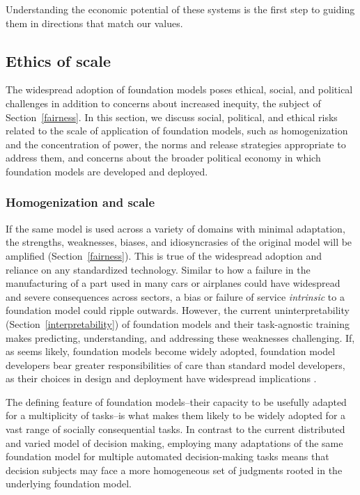 Understanding the economic potential of these systems is the first step to guiding them in directions that match our values.

\newsection
\subsection{Ethics of scale}
\label{sec:ethics}

The widespread adoption of foundation models poses ethical, social, and political challenges in addition to concerns about increased inequity, the subject of Section~\ref{fairness}. 
In this section, we discuss social, political, and ethical risks  related to the scale of application of foundation models, such as homogenization and the concentration of power, the norms and release strategies appropriate to address them, and concerns about the broader political economy in which foundation models are developed and deployed. 

\subsubsection{Homogenization and scale} 

If the same model is used across a variety of domains with minimal adaptation, the strengths, weaknesses, biases, and idiosyncrasies of the original model will be amplified (Section~\ref{fairness}). 
This is true of the widespread adoption and reliance on any standardized technology. Similar to how a failure in the manufacturing of a part used in many cars or airplanes could have widespread and severe consequences across sectors, a bias or failure of service \textit{intrinsic} to a foundation model could ripple outwards. However, the current uninterpretability (Section~\ref{interpretability}) of foundation models and their task-agnostic training makes predicting, understanding, and addressing these weaknesses challenging. If, as seems likely, foundation models become widely adopted, foundation model developers bear greater responsibilities of care than standard model developers, as their choices in design and deployment  have widespread implications \citep{Arendt1987}. 

The defining feature of foundation models--their capacity to be usefully adapted for a multiplicity of tasks--is what makes them likely to be widely adopted for a vast range of socially consequential tasks. In contrast to the current distributed and varied model of decision making, employing many adaptations of the same foundation model for multiple automated decision-making tasks means that decision subjects may face a more homogeneous set of judgments rooted in the underlying foundation model. 

